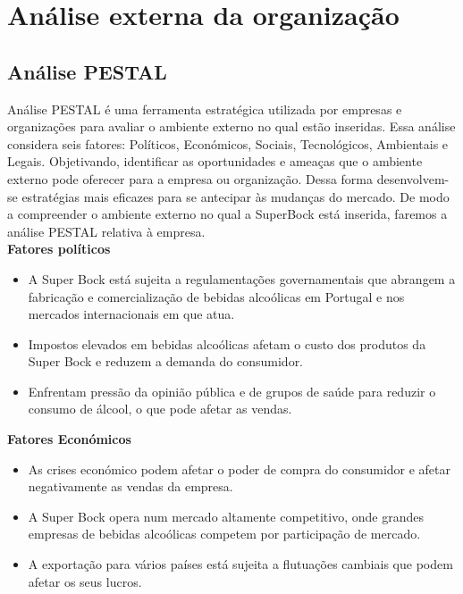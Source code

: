 \chapter{Análise externa da organização}
\label{Chapter3} %

\section{Análise PESTAL}

Análise PESTAL é uma ferramenta estratégica utilizada por empresas e organizações para avaliar o ambiente externo no qual estão inseridas. Essa análise considera seis fatores: Políticos, Económicos, Sociais, Tecnológicos, Ambientais e Legais. Objetivando, identificar as oportunidades e ameaças que o ambiente externo pode oferecer para a empresa ou organização. Dessa forma desenvolvem-se estratégias mais eficazes para se antecipar às mudanças do mercado\cite{ref6}. De modo a compreender o ambiente externo no qual a SuperBock está inserida, faremos a análise PESTAL relativa à empresa.\\


\noindent \textbf{Fatores políticos} %
\begin{itemize}
    \item A Super Bock está sujeita a regulamentações governamentais que abrangem a fabricação e comercialização de bebidas alcoólicas em Portugal e nos mercados internacionais em que atua\cite{ref7}.
    \item Impostos elevados em bebidas alcoólicas afetam o custo dos produtos da Super Bock e reduzem a demanda do consumidor.
    \item Enfrentam pressão da opinião pública e de grupos de saúde para reduzir o consumo de álcool, o que pode afetar as vendas.
\end{itemize}


\noindent \textbf{Fatores Económicos} %
\begin{itemize}
    \item As crises económico podem afetar o poder de compra do consumidor e afetar negativamente as vendas da empresa.
    \item A Super Bock opera num mercado altamente competitivo, onde grandes empresas de bebidas alcoólicas competem por participação de mercado\cite{ref7}.
    \item A exportação para vários países está sujeita a flutuações cambiais que podem afetar os seus lucros\cite{ref7}.
\end{itemize}

